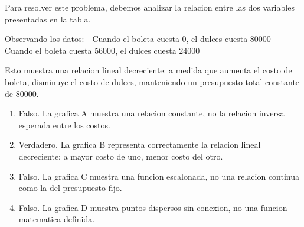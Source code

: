 \documentclass[a4paper]{article}
\makeatletter
\newenvironment{solution}{\comment}{\endcomment}
\newenvironment{answerlist}{\renewcommand{\labelenumii}{(\alph{enumii})}\begin{enumerate}}{\end{enumerate}}
\newcommand{\exname}[1]{\def\@exname{#1}}
\newcommand{\extype}[1]{\def\@extype{#1}}
\newcommand{\exsolution}[1]{\def\@exsolution{#1}}
\newcommand{\exshuffle}[1]{\def\@exshuffle{#1}}
\newcommand{\exsection}[1]{\def\@exsection{#1}}
\makeatother
\begin{document}
\begin{enumerate}
\begin{solution}

Para resolver este problema, debemos analizar la relacion entre las dos variables presentadas en la tabla.

Observando los datos:
- Cuando el boleta cuesta $0$, el dulces cuesta $80000$
- Cuando el boleta cuesta $56000$, el dulces cuesta $24000$

Esto muestra una relacion lineal decreciente: a medida que aumenta el costo de boleta, disminuye el costo de dulces, manteniendo un presupuesto total constante de $80000$.

\begin{answerlist}
  \item Falso. La grafica A muestra una relacion constante, no la relacion inversa esperada entre los costos.
  \item Verdadero. La grafica B representa correctamente la relacion lineal decreciente: a mayor costo de uno, menor costo del otro.
  \item Falso. La grafica C muestra una funcion escalonada, no una relacion continua como la del presupuesto fijo.
  \item Falso. La grafica D muestra puntos dispersos sin conexion, no una funcion matematica definida.
\end{answerlist}
\end{solution}

\exname{Costo Boleta Interpretacion Representacion}
\extype{schoice}
\exsolution{0100}
\exshuffle{TRUE}
\exsection{Interpretacion y Representacion}

\end{enumerate}
\end{document}
